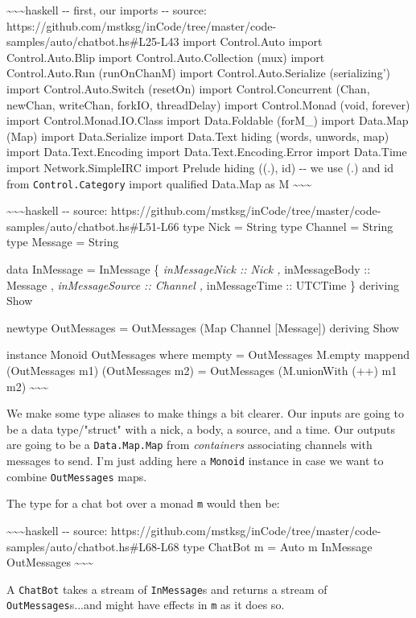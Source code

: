 \documentclass[]{article}
\begin{document}
\textasciitilde{}\textasciitilde{}\textasciitilde{}haskell -\/- first, our
imports -\/- source:
https://github.com/mstksg/inCode/tree/master/code-samples/auto/chatbot.hs\#L25-L43
import Control.Auto import Control.Auto.Blip import Control.Auto.Collection
(mux) import Control.Auto.Run (runOnChanM) import Control.Auto.Serialize
(serializing') import Control.Auto.Switch (resetOn) import Control.Concurrent
(Chan, newChan, writeChan, forkIO, threadDelay) import Control.Monad (void,
forever) import Control.Monad.IO.Class import Data.Foldable (forM\_) import
Data.Map (Map) import Data.Serialize import Data.Text hiding (words, unwords,
map) import Data.Text.Encoding import Data.Text.Encoding.Error import Data.Time
import Network.SimpleIRC import Prelude hiding ((.), id) -\/- we use (.) and id
from \texttt{Control.Category} import qualified Data.Map as M
\textasciitilde{}\textasciitilde{}\textasciitilde{}

\textasciitilde{}\textasciitilde{}\textasciitilde{}haskell -\/- source:
https://github.com/mstksg/inCode/tree/master/code-samples/auto/chatbot.hs\#L51-L66
type Nick = String type Channel = String type Message = String

data InMessage = InMessage \{ \emph{inMessageNick :: Nick , }inMessageBody ::
Message , \emph{inMessageSource :: Channel , }inMessageTime :: UTCTime \}
deriving Show

newtype OutMessages = OutMessages (Map Channel {[}Message{]}) deriving Show

instance Monoid OutMessages where mempty = OutMessages M.empty mappend
(OutMessages m1) (OutMessages m2) = OutMessages (M.unionWith (++) m1 m2)
\textasciitilde{}\textasciitilde{}\textasciitilde{}

We make some type aliases to make things a bit clearer. Our inputs are going to
be a data type/"struct" with a nick, a body, a source, and a time. Our outputs
are going to be a \texttt{Data.Map.Map} from \emph{containers} associating
channels with messages to send. I'm just adding here a \texttt{Monoid} instance
in case we want to combine \texttt{OutMessages} maps.

The type for a chat bot over a monad \texttt{m} would then be:

\textasciitilde{}\textasciitilde{}\textasciitilde{}haskell -\/- source:
https://github.com/mstksg/inCode/tree/master/code-samples/auto/chatbot.hs\#L68-L68
type ChatBot m = Auto m InMessage OutMessages
\textasciitilde{}\textasciitilde{}\textasciitilde{}

A \texttt{ChatBot} takes a stream of \texttt{InMessage}s and returns a stream of
\texttt{OutMessages}s...and might have effects in \texttt{m} as it does so.
\end{document}
